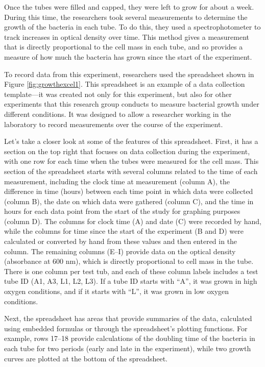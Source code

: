 \documentclass[]{tufte-book}
\begin{document}
Once the tubes were filled and capped, they were left to grow for about a week.
During this time, the researchers took several measurements to determine the
growth of the bacteria in each tube. To do this, they used a spectrophotometer
to track increases in optical density over time. This
method gives a measurement that is directly proportional
to the cell mass in each tube, and so provides a measure of how much the
bacteria has grown since the start of the experiment.

To record data from this experiment, researchers used the spreadsheet shown in
Figure \ref{fig:growthexcel1}. This spreadsheet is an example of a data
collection template---it was created not only for this experiment, but also for
other experiments that this research group conducts to measure bacterial growth
under different conditions. It was designed to allow a researcher working in the
laboratory to record measurements over the course of the experiment.

Let's take a closer look at some of the features of this spreadsheet. First, it
has a section on the top right that focuses on data collection during the
experiment, with one row for each time when the tubes were measured for the cell
mass. This section of the spreadsheet starts with several
columns related to the time of each measurement, including the clock time at
measurement (column A), the difference in time (hours) between each time point
in which data were collected (column B), the date on which data were gathered
(column C), and the time in hours for each data point from the start of the
study for graphing purposes (column D). The columns for clock time (A) and date
(C) were recorded by hand, while the columns for time since the start of the
experiment (B and D) were calculated or converted by hand from these values and
then entered in the column. The remaining columns (E--I) provide data on the
optical density (absorbance at 600 nm), which is directly proportional to cell
mass in the tube. There is one column per test tub, and each of these column
labels includes a test tube ID (A1, A3, L1, L2, L3). If a tube ID starts with
``A'', it was grown in high oxygen conditions, and if it starts with ``L'', it was
grown in low oxygen conditions.

Next, the spreadsheet has areas that provide summaries of the data, calculated
using embedded formulas or through the spreadsheet's plotting functions. For
example, rows 17--18 provide calculations of the doubling time of the bacteria
in each tube for two periods (early and late in the experiment), while two
growth curves are plotted at the bottom of the spreadsheet.
\end{document}
